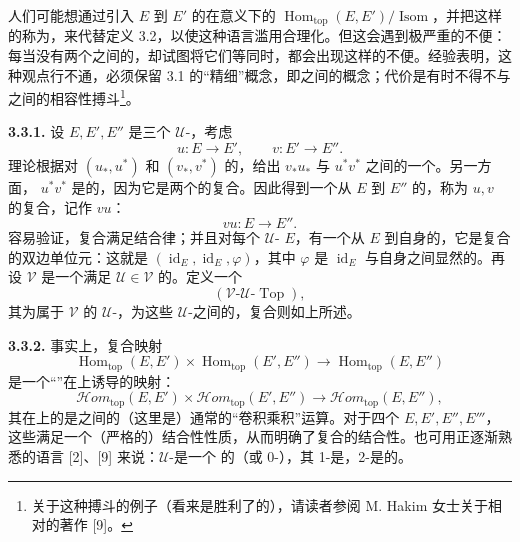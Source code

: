 人们可能想通过引入 $E$ 到 $E'$ 的在意义下的 $\operatorname{Hom}_{\mathrm{top}}(E,E')/\operatorname{Isom}$，并把这样的称为，来代替定义 3.2，以使这种语言滥用合理化。但这会遇到极严重的不便：每当没有两个之间的，却试图将它们等同时，都会出现这样的不便。经验表明，这种观点行不通，必须保留 3.1 的“精细”概念，即之间的概念；代价是有时不得不与之间的相容性搏斗\footnote{关于这种搏斗的例子（看来是胜利了的），请读者参阅 M. Hakim 女士关于相对的著作 [9]。}。

\textbf{3.3.1.} 设 $E,E',E''$ 是三个 $\mathcal U$-，考虑
\[
 u:E\longrightarrow E',\qquad v:E'\longrightarrow E''.
\]
理论根据对 $(u_*,u^*)$ 和 $(v_*,v^*)$ 的，给出 $v_*u_*$ 与 $u^*v^*$ 之间的一个。另一方面， $u^*v^*$ 是的，因为它是两个的复合。因此得到一个从 $E$ 到 $E''$ 的，称为 $u,v$ 的复合，记作 $vu$：
\[
 vu:E\longrightarrow E''.
\]
容易验证，复合满足结合律；并且对每个 $\mathcal U$- $E$，有一个从 $E$ 到自身的，它是复合的双边单位元：这就是 $(\operatorname{id}_E,\operatorname{id}_E,\varphi)$，其中 $\varphi$ 是 $\operatorname{id}_E$ 与自身之间显然的。再设 $\mathcal V$ 是一个满足 $\mathcal U\in\mathcal V$ 的。定义一个
\[
 (\mathcal V\text{-}\mathcal U\text{-}\operatorname{Top}),
\]
其为属于 $\mathcal V$ 的 $\mathcal U$-，为这些 $\mathcal U$-之间的，复合则如上所述。

\textbf{3.3.2.} 事实上，复合映射
\[
 \operatorname{Hom}_{\mathrm{top}}(E,E')\times\operatorname{Hom}_{\mathrm{top}}(E',E'')\longrightarrow\operatorname{Hom}_{\mathrm{top}}(E,E'')
\]
是一个“”在上诱导的映射：
\[
 \mathscr Hom_{\mathrm{top}}(E,E')\times\mathscr Hom_{\mathrm{top}}(E',E'')\longrightarrow\mathscr Hom_{\mathrm{top}}(E,E''),
\]
其在上的是之间的（这里是）通常的“卷积乘积”运算。对于四个 $E,E',E'',
E'''$，这些满足一个（严格的）结合性性质，从而明确了复合的结合性。也可用正逐渐熟悉的语言 [2]、[9] 来说：$\mathcal U$-是一个 的（或 0-），其 1-是，2-是的。

